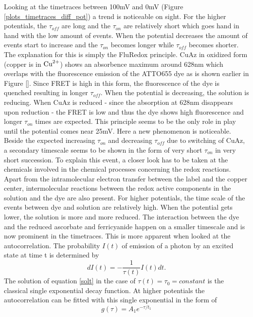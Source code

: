 \documentclass[twoside,single]{lion-msc}
\begin{document}
Looking at the timetraces between 100mV and 0mV (Figure \ref{plots_timetraces_diff_pot}) a trend is noticeable on sight. For the higher potentials, the $\tau_{off}$ are long and the $\tau_{on}$ are relatively short which goes hand in hand with the low amount of events. When the potential decreases the amount of events start to increase and the $\tau_{on}$ becomes longer while $\tau_{off}$ becomes shorter. The explanation for this is simply the FluRedox principle. CuAz in oxidized form (copper is in $\textup{Cu}^{2+}$) shows an absorbence maximum around 628nm which overlaps with the fluorescence emission of the ATTO655 dye as is shown earlier in Figure \ref{}. Since FRET is high in this form, the fluorescence of the dye is quenched resulting in longer $\tau_{off}$. When the potential is decreasing, the solution is reducing. When CuAz is reduced - since the absorption at 628nm disappears upon reduction - the FRET is low and thus the dye  shows high fluorescence and longer $\tau_{on}$ times are expected. This principle seems to be the only role in play until the potential comes near 25mV. Here a new phenomenon is noticeable. Beside the expected  increasing $\tau_{on}$ and decreasing $\tau_{off}$ due to switching of CuAz, a secondary timescale seems to be shown in the form of very short $\tau_{on}$ in very short succession. To explain this event, a closer look has to be taken at the chemicals involved in the chemical processes concerning the redox reactions. Apart from the intramolecular electron transfer between the label and the copper center, intermolecular reactions between the redox active components in the solution and the dye are also present. For higher potentials, the time scale of the events between dye and solution are relatively high. When the potential gets lower, the solution is more and more reduced. The interaction between the dye and the reduced ascorbate and ferricyanide happen on a smaller timescale and is now prominent in the timetraces. This is more apparent when looked at the autocorrelation. The probability $I(t)$ of emission of a photon by an excited state at time t is determined by
\begin{equation} \label{solt}
dI(t) = -\frac{1}{\tau(t)}I(t)dt.
\end{equation}
The solution of equation \ref{solt} in the case of $\tau(t) = \tau_{0}= constant$ is the classical single exponential decay function. At higher potentials the autocorrelation can be fitted with this single exponential in the form of
\begin{equation} \label{single_exp}
g(\tau) =  A_{1}e^{-\tau/t_{1}}
\end{equation}
\end{document}
